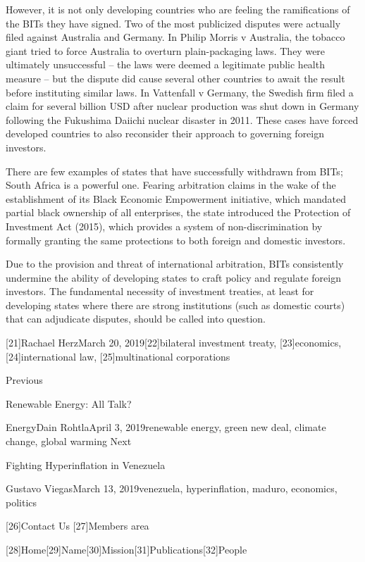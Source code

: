    However, it is not only developing countries who are feeling the
   ramifications of the BITs they have signed. Two of the most publicized
   disputes were actually filed against Australia and Germany. In Philip
   Morris v Australia, the tobacco giant tried to force Australia to
   overturn plain-packaging laws. They were ultimately unsuccessful -- the
   laws were deemed a legitimate public health measure -- but the dispute
   did cause several other countries to await the result before
   instituting similar laws. In Vattenfall v Germany, the Swedish firm
   filed a claim for several billion USD after nuclear production was shut
   down in Germany following the Fukushima Daiichi nuclear disaster in
   2011. These cases have forced developed countries to also reconsider
   their approach to governing foreign investors.

   There are few examples of states that have successfully withdrawn from
   BITs; South Africa is a powerful one. Fearing arbitration claims in the
   wake of the establishment of its Black Economic Empowerment initiative,
   which mandated partial black ownership of all enterprises, the state
   introduced the Protection of Investment Act (2015), which provides a
   system of non-discrimination by formally granting the same protections
   to both foreign and domestic investors.

   Due to the provision and threat of international arbitration, BITs
   consistently undermine the ability of developing states to craft policy
   and regulate foreign investors. The fundamental necessity of investment
   treaties, at least for developing states where there are strong
   institutions (such as domestic courts) that can adjudicate disputes,
   should be called into question.

   [21]Rachael HerzMarch 20, 2019[22]bilateral investment treaty,
   [23]economics, [24]international law, [25]multinational corporations

   Previous

Renewable Energy: All Talk?

   EnergyDain RohtlaApril 3, 2019renewable energy, green new deal, climate
   change, global warming
   Next

Fighting Hyperinflation in Venezuela

   Gustavo ViegasMarch 13, 2019venezuela, hyperinflation, maduro,
   economics, politics

   [26]Contact Us
   [27]Members area

   [28]Home[29]Name[30]Mission[31]Publications[32]People

